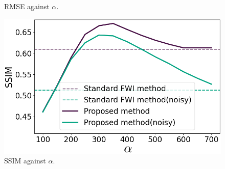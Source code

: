 \begin{figure}[htbp]
\begin{minipage}{58mm}
        \caption{RMSE against $\alpha$.}
        \label{fig:alpha-rmse}
        \vspace{3mm}
    \end{minipage}
    \hspace{-2mm}
    \begin{minipage}{58mm}
        \centering
        \includegraphics[width=\linewidth]{public/alpha-ssim-colored}
        \caption{SSIM against $\alpha$.}
        \label{fig:alpha-ssim}
        \vspace{3mm}
    \end{minipage}
\end{figure}
